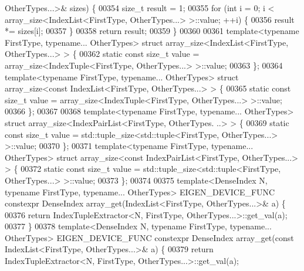 \begin{DoxyCode}
       OtherTypes...>& sizes) \{
00354   \textcolor{keywordtype}{size\_t} result = 1;
00355   \textcolor{keywordflow}{for} (\textcolor{keywordtype}{int} i = 0; i < array\_size<IndexList<FirstType, OtherTypes...> >::value; ++i) \{
00356     result *= sizes[i];
00357   \}
00358   \textcolor{keywordflow}{return} result;
00359 \}
00360 
00361 \textcolor{keyword}{template}<\textcolor{keyword}{typename} FirstType, \textcolor{keyword}{typename}... OtherTypes> \textcolor{keyword}{struct }array\_size<IndexList<FirstType, OtherTypes...> 
      > \{
00362   \textcolor{keyword}{static} \textcolor{keyword}{const} \textcolor{keywordtype}{size\_t} value = array\_size<IndexTuple<FirstType, OtherTypes...> >::value;
00363 \};
00364 \textcolor{keyword}{template}<\textcolor{keyword}{typename} FirstType, \textcolor{keyword}{typename}... OtherTypes> \textcolor{keyword}{struct }array\_size<const IndexList<FirstType, 
      OtherTypes...> > \{
00365   \textcolor{keyword}{static} \textcolor{keyword}{const} \textcolor{keywordtype}{size\_t} value = array\_size<IndexTuple<FirstType, OtherTypes...> >::value;
00366 \};
00367 
00368 \textcolor{keyword}{template}<\textcolor{keyword}{typename} FirstType, \textcolor{keyword}{typename}... OtherTypes> \textcolor{keyword}{struct }array\_size<IndexPairList<FirstType, OtherTypes.
      ..> > \{
00369   \textcolor{keyword}{static} \textcolor{keyword}{const} \textcolor{keywordtype}{size\_t} value = std::tuple\_size<std::tuple<FirstType, OtherTypes...> >::value;
00370 \};
00371 \textcolor{keyword}{template}<\textcolor{keyword}{typename} FirstType, \textcolor{keyword}{typename}... OtherTypes> \textcolor{keyword}{struct }array\_size<const IndexPairList<FirstType, 
      OtherTypes...> > \{
00372   \textcolor{keyword}{static} \textcolor{keyword}{const} \textcolor{keywordtype}{size\_t} value = std::tuple\_size<std::tuple<FirstType, OtherTypes...> >::value;
00373 \};
00374 
00375 \textcolor{keyword}{template}<DenseIndex N, \textcolor{keyword}{typename} FirstType, \textcolor{keyword}{typename}... OtherTypes> EIGEN\_DEVICE\_FUNC constexpr DenseIndex 
      array\_get(IndexList<FirstType, OtherTypes...>& a) \{
00376   \textcolor{keywordflow}{return} IndexTupleExtractor<N, FirstType, OtherTypes...>::get\_val(a);
00377 \}
00378 \textcolor{keyword}{template}<DenseIndex N, \textcolor{keyword}{typename} FirstType, \textcolor{keyword}{typename}... OtherTypes> EIGEN\_DEVICE\_FUNC constexpr DenseIndex 
      array\_get(\textcolor{keyword}{const} IndexList<FirstType, OtherTypes...>& a) \{
00379   \textcolor{keywordflow}{return} IndexTupleExtractor<N, FirstType, OtherTypes...>::get\_val(a);

\end{DoxyCode}
